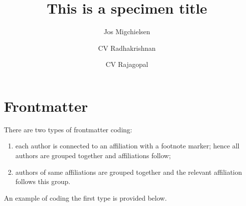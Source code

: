 \documentclass[a4paper,12pt]{article}
\begin{document}
\section{Frontmatter}

There are two types of frontmatter coding:
\begin{enumerate}[(1)]
\item each author is
connected to an affiliation with a footnote marker; hence all
authors are grouped together and affiliations follow;
\pagebreak
\item authors of same affiliations are grouped together and the
relevant affiliation follows this group. 
\end{enumerate}

An example of coding the first type is provided below.

\begin{vquote}
 \title{This is a specimen title}
\end{vquote}

\begin{vquote}
\author[1]{Jos Migchielsen%
  }

\author[2]{CV Radhakrishnan}

\author[3]{CV Rajagopal}
\end{vquote}

\begin{vquote}

 \address[1]{Elsevier B.V., Radarweg 29, 1043 NX Amsterdam, 
   The Netherlands}
 \address[2]{Sayahna Foundations, JWRA 34, Jagathy, 
   Trivandrum 695014, India}
 \address[3]{STM Document Engineering Pvt Ltd., Mepukada,
   Malayinkil, Trivandrum 695571, India}
\end{vquote}
\end{document}

